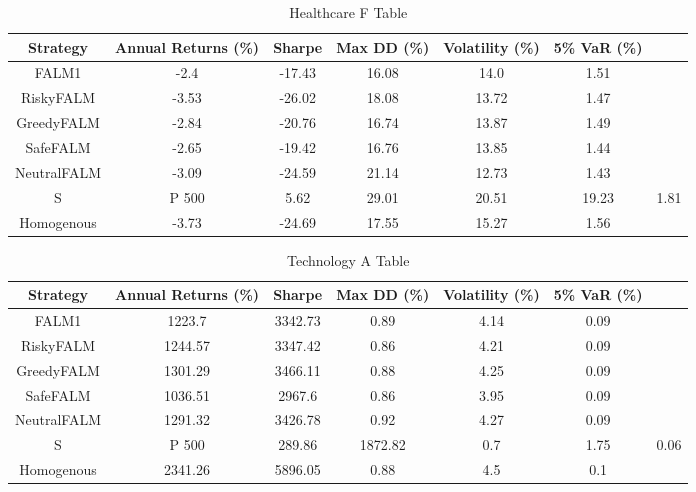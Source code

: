 \begin{table}[]
    \centering
    \caption{Healthcare F Table}
    \begin{tabular}{|c|c|c|c|c|c|c|}
        \hline
        Strategy & Annual Returns (\%) & Sharpe & Max \ac{DD} (\%) & Volatility (\%)& 5\% \ac{VaR} (\%) \\
        \hline
        FALM1 & -2.4 & -17.43 & 16.08 & 14.0 & 1.51 \\
        RiskyFALM & -3.53 & -26.02 & 18.08 & 13.72 & 1.47 \\
        GreedyFALM & -2.84 & -20.76 & 16.74 & 13.87 & 1.49 \\
        SafeFALM & -2.65 & -19.42 & 16.76 & 13.85 & 1.44 \\
        NeutralFALM & -3.09 & -24.59 & 21.14 & 12.73 & 1.43 \\
        S&P 500 & 5.62 & 29.01 & 20.51 & 19.23 & 1.81 \\
        Homogenous & -3.73 & -24.69 & 17.55 & 15.27 & 1.56 \\
        \hline
    \end{tabular}
    \label{tab:healthcare_f_table}
\end{table}

\begin{table}[]
    \centering
    \caption{Technology A Table}
    \begin{tabular}{|c|c|c|c|c|c|c|}
        \hline
        Strategy & Annual Returns (\%) & Sharpe & Max \ac{DD} (\%) & Volatility (\%)& 5\% \ac{VaR} (\%) \\
        \hline
        FALM1 & 1223.7 & 3342.73 & 0.89 & 4.14 & 0.09 \\
        RiskyFALM & 1244.57 & 3347.42 & 0.86 & 4.21 & 0.09 \\
        GreedyFALM & 1301.29 & 3466.11 & 0.88 & 4.25 & 0.09 \\
        SafeFALM & 1036.51 & 2967.6 & 0.86 & 3.95 & 0.09 \\
        NeutralFALM & 1291.32 & 3426.78 & 0.92 & 4.27 & 0.09 \\
        S&P 500 & 289.86 & 1872.82 & 0.7 & 1.75 & 0.06 \\
        Homogenous & 2341.26 & 5896.05 & 0.88 & 4.5 & 0.1 \\
        \hline
    \end{tabular}
    \label{tab:technology_a_table}
\end{table}

